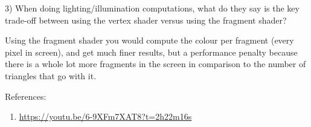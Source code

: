 \documentclass[12pt]{article}
\begin{document}
3) When doing lighting/illumination computations, what do they say is the key trade-off between using the vertex shader versus using the fragment shader?

Using the fragment shader you would compute the colour per fragment (every pixel in screen), and get much finer results, but a performance penalty because there is a whole lot more fragments in the screen in comparison to the number of triangles that go with it.

References:
\begin{enumerate}
    \item \url{https://youtu.be/6-9XFm7XAT8?t=2h22m16s}
\end{enumerate}
\end{document}
